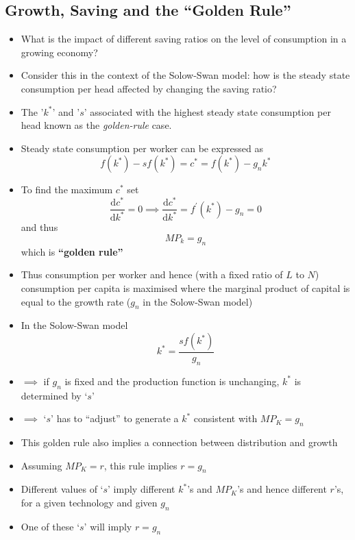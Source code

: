 \documentclass{article}
\begin{document}
\subsection{Growth, Saving and the ``Golden Rule''}
	\begin{itemize}
		\item What is the impact of different saving ratios on the level of consumption in a growing economy?
		\item Consider this in the context of the Solow-Swan model: how is the steady state consumption per head affected by changing the saving ratio?
		\item The '\( k^\ast \)' and '\( s \)' associated with the highest steady state consumption per head known as the \textit{golden-rule} case.
		\item Steady state consumption per worker can be expressed as
		\begin{equation}
			f(k^\ast) - sf(k^\ast) = c^\ast = f(k^\ast) - g_n k^\ast \label{eq:4.1}
		\end{equation}
		\item To find the maximum \( c^\ast \) set
		\begin{equation}
			\frac{\mathrm{d}c^\ast}{\mathrm{d}k^\ast} = 0 \implies \frac{\mathrm{d}c^\ast}{\mathrm{d}k^\ast} = f^\prime(k^\ast) - g_n = 0 \label{eq:4.2}
		\end{equation}
		and thus
		\begin{equation}
			MP_k = g_n \label{eq:4.3}
		\end{equation}
		which is \textcolor{myblue}{\textbf{``golden rule''}}
		\item Thus consumption per worker and hence (with a fixed ratio of \( L \) to \( N \)) consumption per capita is maximised where the marginal product of capital is equal to the growth rate (\( g_n \) in the Solow-Swan model)
		\item In the Solow-Swan model
		\begin{equation}
			k^\ast = \frac{sf(k^\ast)}{g_n} \label{eq:4.4}
		\end{equation}
		\item \( \implies \) if \( g_n \) is fixed and the production function is unchanging, \( k^\ast \) is determined by `\( s \)'
		\item \( \implies \) `\( s \)' has to ``adjust'' to generate a \( k^\ast \) consistent with \( MP_K = g_n \) 
		\item This golden rule also implies a connection between distribution and growth
		\item Assuming \( MP_K = r \), this rule implies \( r = g_n \)
		\item Different values of `\( s \)' imply different \( k^\ast \)'s and \( MP_K \)'s and hence different \( r \)'s, for a given technology and given \( g_n \)
		\item One of these `\( s \)' will imply \( r = g_n \) 
	\end{itemize}
\end{document}
